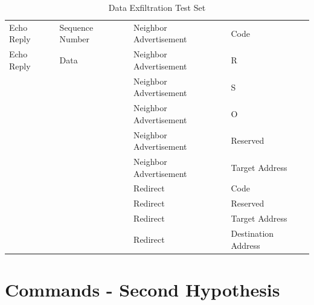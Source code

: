 \documentclass[12pt]{article}
\begin{document}
\begin{savenotes}
\begin{table}[!htpb]
{\begin{tabular}{|L{4.5cm}|L{3.5cm}|L{4.5cm}|L{3.5cm}|}
Echo Reply&Sequence Number&Neighbor Advertisement&Code\\
Echo Reply&Data&Neighbor Advertisement&R\\
&&Neighbor Advertisement&S\\
&&Neighbor Advertisement&O\\
&&Neighbor Advertisement&Reserved\\
&&Neighbor Advertisement&Target Address\\
&&Redirect&Code\\
&&Redirect&Reserved\\
&&Redirect&Target Address\\
&&Redirect&Destination Address\\
\hline
\end{tabular}}
\caption{Data Exfiltration Test Set}
\label{table:exfiltrationTestSet}
\end{table}
\end{savenotes}

\newpage

\section{Commands - Second Hypothesis}
\label{AppendixCommands}
\end{document}
